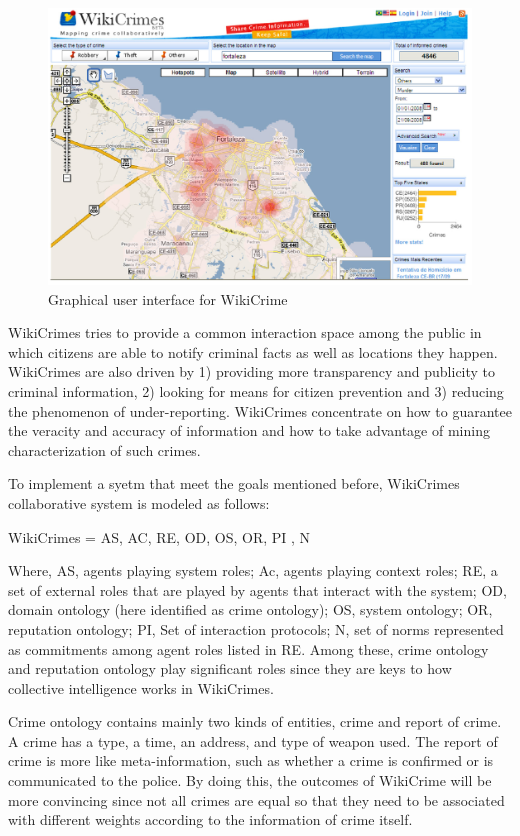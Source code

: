 \begin{figure}[!h]
\centering
\includegraphics[width=0.9\columnwidth]{figure/wikicrime}
\caption{Graphical user interface for WikiCrime}
\label{fig:WikiCrimeGUI}
\end{figure}

WikiCrimes tries to provide a common interaction space among the public in which citizens are able to notify criminal facts as well as locations they happen. WikiCrimes are also driven by 1) providing more transparency and publicity to criminal information, 2) looking for means for citizen prevention and 3) reducing the phenomenon of under-reporting. WikiCrimes concentrate on how to guarantee the veracity and accuracy of information and how to take advantage of mining characterization of such crimes.

To implement a syetm that meet the goals mentioned before, WikiCrimes collaborative system is modeled as follows:

\centerline{WikiCrimes = {AS, AC, RE, OD, OS, OR, PI , N}}

Where, AS, agents playing system roles; Ac, agents playing context roles; RE, a set of external roles that are played by agents that interact with the system; OD, domain ontology (here identified as crime ontology); OS, system ontology; OR, reputation ontology; PI, Set of interaction protocols; N, set of norms represented as commitments among agent roles listed in RE. Among these, crime ontology and reputation ontology play significant roles since they are keys to how collective intelligence works in WikiCrimes.

Crime ontology contains mainly two kinds of entities, crime and report of crime. A crime has a type, a time, an address, and type of weapon used. The report of crime is more like meta-information, such as whether a crime is confirmed or is communicated to the police. By doing this, the outcomes of WikiCrime will be more convincing since not all crimes are equal so that they need to be associated with different weights according to the information of crime itself.

